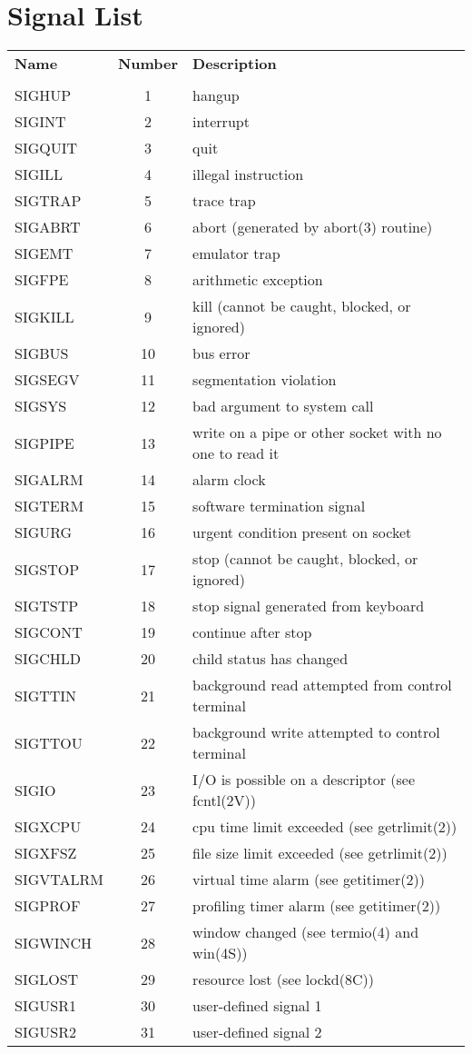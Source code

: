\chapter{Signal List}
\newpage
\begin{tabular} {l c l}
{\bf Name}& {\bf Number} & {\bf Description}\\
          &       &  \\
SIGHUP    &   1   &  hangup\\
SIGINT    &   2   &  interrupt\\
SIGQUIT   &   3   &  quit\\
SIGILL    &   4   &  illegal instruction\\
SIGTRAP   &   5   &  trace trap\\
SIGABRT   &   6   &  abort (generated by abort(3) routine)\\
SIGEMT    &   7   &  emulator trap\\
SIGFPE    &   8   &  arithmetic exception\\
SIGKILL   &   9   &  kill (cannot be caught, blocked, or ignored)\\
SIGBUS    &   10  &  bus error\\
SIGSEGV   &   11  &  segmentation violation\\
SIGSYS    &   12  &  bad argument to system call\\
SIGPIPE   &   13  &  write on a pipe or other socket with no one to read it\\
SIGALRM   &   14  &  alarm clock\\
SIGTERM   &   15  &  software termination signal\\
SIGURG    &   16  &  urgent condition present on socket\\
SIGSTOP   &   17  &  stop (cannot be caught, blocked, or ignored)\\
SIGTSTP   &   18  &  stop signal generated from keyboard\\
SIGCONT   &   19  &  continue after stop\\
SIGCHLD   &   20  &  child status has changed\\
SIGTTIN   &   21  &  background read attempted from control terminal\\
SIGTTOU   &   22  &  background write attempted to control terminal\\
SIGIO     &   23  &  I/O is possible on a descriptor (see fcntl(2V))\\
SIGXCPU   &   24  &  cpu time limit exceeded (see getrlimit(2))\\
SIGXFSZ   &   25  &  file size limit exceeded (see getrlimit(2))\\
SIGVTALRM &   26  &  virtual time alarm (see getitimer(2))\\
SIGPROF   &   27  &  profiling timer alarm (see getitimer(2))\\
SIGWINCH  &   28  & window changed (see termio(4) and win(4S))\\
SIGLOST   &   29  &  resource lost (see lockd(8C))\\
SIGUSR1   &   30  &  user-defined signal 1\\
SIGUSR2   &   31  &  user-defined signal 2\\
\end{tabular}
